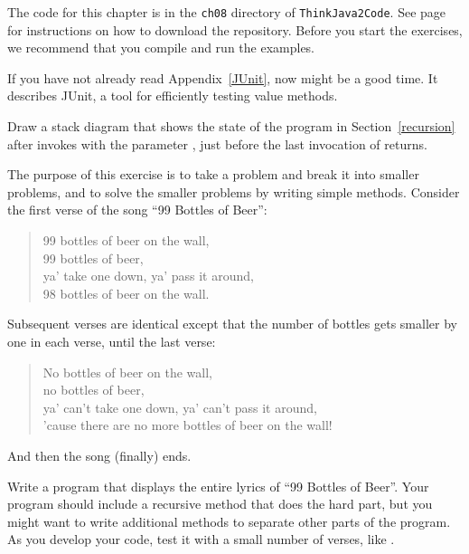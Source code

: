 The code for this chapter is in the {\tt ch08} directory of {\tt ThinkJava2Code}.
See page~\pageref{code} for instructions on how to download the repository.
Before you start the exercises, we recommend that you compile and run the examples.

If you have not already read Appendix~\ref{JUnit}, now might be a good time.
It describes JUnit, a tool for efficiently testing value methods.


\begin{exercise}  %

Draw a stack diagram that shows the state of the program in Section~\ref{recursion} after  invokes  with the parameter , just before the last invocation of  returns.

\end{exercise}


\begin{exercise}  %

The purpose of this exercise is to take a problem and break it into smaller problems, and to solve the smaller problems by writing simple methods.
Consider the first verse of the song ``99 Bottles of Beer'':

\begin{quote}
99 bottles of beer on the wall,\\
99 bottles of beer,\\
ya' take one down, ya' pass it around,\\
98 bottles of beer on the wall.
\end{quote}

Subsequent verses are identical except that the number of bottles gets smaller by one in each verse, until the last verse:

\begin{quote}
No bottles of beer on the wall,\\
no bottles of beer,\\
ya' can't take one down, ya' can't pass it around,\\
'cause there are no more bottles of beer on the wall!
\end{quote}

And then the song (finally) ends.

Write a program that displays the entire lyrics of ``99 Bottles of Beer''.
Your program should include a recursive method that does the hard part, but you might want to write additional methods to separate other parts of the program.
As you develop your code, test it with a small number of verses, like .

\end{exercise}


